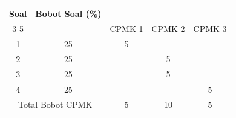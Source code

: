 \documentclass[11pt,a4paper]{article}
\begin{document}
\begin{center}
  \begin{tabular}{|c|c|c|c|c|}
    \hline
    \multirow{2}{*}{Soal}                  & \multirow{2}{*}{Bobot Soal (\%)} & \multicolumn{3}{c|}{}                   \\ \cline{3-5}
                                           &                                  & CPMK-1                & CPMK-2 & CPMK-3 \\ \hline
    1                                      & 25                               & 5                     &        &        \\ \hline
    2                                      & 25                               &                       & 5      &        \\ \hline
    3                                      & 25                               &                       & 5      &        \\ \hline
    4                                      & 25                               &                       &        & 5      \\ \hline
    \multicolumn{2}{|c|}{Total Bobot CPMK} & 5                                & 10                    & 5               \\ \hline
  \end{tabular}
\end{center}
\end{document}
